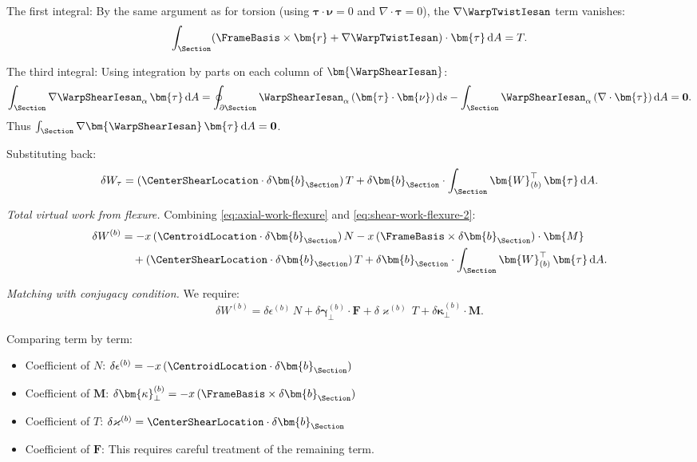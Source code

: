 The first integral: By the same argument as for torsion (using $\bm{\tau} \cdot \bm{\nu} = 0$ 
and $\nabla \cdot \bm{\tau} = 0$), the $\nabla\WarpTwistIesan$ term vanishes:
\begin{equation*}
\int_\Section (\FrameBasis \times \bm{r} + \nabla\WarpTwistIesan) \cdot \bm{\tau} \, \mathrm{d}A = T.
\end{equation*}

The third integral: Using integration by parts on each column of $\bm{\WarpShearIesan}$:
\begin{equation*}
\int_\Section \nabla\WarpShearIesan_\alpha\,\bm{\tau} \, \mathrm{d}A 
= \oint_{\partial\Section} \WarpShearIesan_\alpha\,(\bm{\tau} \cdot \bm{\nu}) \, \mathrm{d}s 
- \int_\Section \WarpShearIesan_\alpha\,(\nabla \cdot \bm{\tau}) \, \mathrm{d}A = \mathbf{0}.
\end{equation*}
Thus $\int_\Section \nabla\bm{\WarpShearIesan}\,\bm{\tau} \, \mathrm{d}A = \mathbf{0}$.

Substituting back:
\begin{equation}
\delta W_\tau = (\CenterShearLocation \cdot \delta\bm{b}_{\Section})\,T 
+ \delta\bm{b}_{\Section} \cdot \int_\Section \bm{W}_{(b)}^\top\,\bm{\tau} \, \mathrm{d}A.
\label{eq:shear-work-flexure-2}
\end{equation}

\emph{Total virtual work from flexure.} Combining \eqref{eq:axial-work-flexure} 
and \eqref{eq:shear-work-flexure-2}:
\begin{align}
\delta W^{(b)} &= -x\,(\CentroidLocation \cdot \delta\bm{b}_{\Section})\,N 
- x\,(\FrameBasis \times \delta\bm{b}_{\Section}) \cdot \bm{M} \notag \\
&\quad + (\CenterShearLocation \cdot \delta\bm{b}_{\Section})\,T 
+ \delta\bm{b}_{\Section} \cdot \int_\Section \bm{W}_{(b)}^\top\,\bm{\tau} \, \mathrm{d}A.
\label{eq:total-work-flexure}
\end{align}

\emph{Matching with conjugacy condition.} We require:
\begin{equation}
\delta W^{(b)} = \delta\epsilon^{(b)}\,N + \delta\bm{\gamma}_\perp^{(b)} \cdot \bm{F} 
+ \delta\varkappa^{(b)}\,T + \delta\bm{\kappa}_\perp^{(b)} \cdot \bm{M}.
\label{eq:match-flexure}
\end{equation}

Comparing term by term:
\begin{itemize}
\item Coefficient of $N$: $\delta\epsilon^{(b)} = -x\,(\CentroidLocation \cdot \delta\bm{b}_{\Section})$
\item Coefficient of $\bm{M}$: $\delta\bm{\kappa}_\perp^{(b)} = -x\,(\FrameBasis \times \delta\bm{b}_{\Section})$
\item Coefficient of $T$: $\delta\varkappa^{(b)} = \CenterShearLocation \cdot \delta\bm{b}_{\Section}$
\item Coefficient of $\bm{F}$: This requires careful treatment of the remaining term.
\end{itemize}

